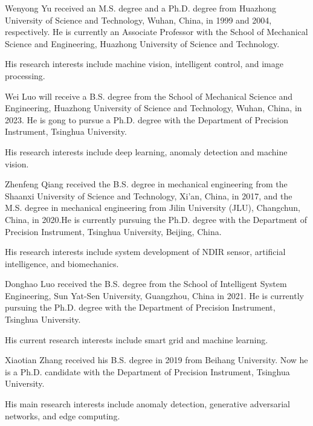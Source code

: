 \documentclass[lettersize,journal]{IEEEtran}
\begin{document}
\begin{IEEEbiography}{Wenyong Yu} received an M.S. degree and a Ph.D. degree from Huazhong University of Science and Technology, Wuhan, China, in 1999 and 2004, respectively. He is currently an Associate Professor with the School of Mechanical Science and Engineering, Huazhong University of Science and Technology. 

His research interests include machine vision, intelligent control, and image processing.

\end{IEEEbiography}

\begin{IEEEbiography}{Wei Luo}
will receive a B.S. degree from the School of Mechanical Science and Engineering, Huazhong University of Science and Technology, Wuhan, China, in 2023. He is gong to pursue a Ph.D. degree with the Department of Precision Instrument, Tsinghua University.

His research interests include deep learning, anomaly detection and machine vision.
\end{IEEEbiography}

\begin{IEEEbiography}{Zhenfeng Qiang} received the B.S. degree in mechanical engineering from the Shaanxi University of Science and Technology, Xi’an, China, in 2017, and the M.S. degree in mechanical engineering from Jilin University (JLU), Changchun, China, in 2020.He is currently pursuing the Ph.D. degree with the Department of Precision Instrument, Tsinghua University, Beijing, China. 

His research interests include system development of NDIR sensor, artificial intelligence, and biomechanics.
\end{IEEEbiography}

\begin{IEEEbiography}{Donghao Luo} received the B.S. degree from the School of Intelligent System Engineering, Sun Yat-Sen University, Guangzhou, China in 2021. He is currently pursuing the Ph.D. degree with the Department of Precision Instrument, Tsinghua University.

His current research interests include smart grid and machine learning.
\end{IEEEbiography}
\begin{IEEEbiography}{Xiaotian Zhang} received his B.S. degree in 2019 from Beihang University. Now he is a Ph.D. candidate with the Department of Precision Instrument, Tsinghua University. 

His main research interests include anomaly detection, generative adversarial networks, and edge computing.
\end{IEEEbiography}



\vfill
\end{document}
